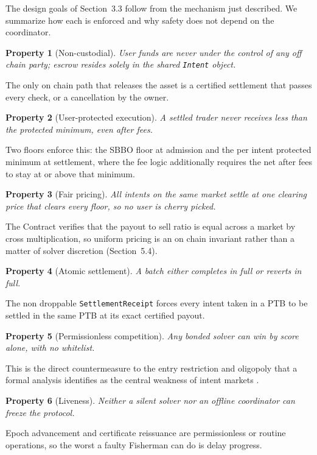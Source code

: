 \documentclass[10pt,sigconf,nonacm]{acmart}
\theoremstyle{reiythm}
\newtheorem{property}{Property}
\begin{document}
The design goals of Section~3.3 follow from the mechanism just described. We
summarize how each is enforced and why safety does not depend on the coordinator.

\begin{property}[Non-custodial]
User funds are never under the control of any off chain party; escrow resides
solely in the shared \texttt{Intent} object.
\end{property}
\noindent The only on chain path that releases the asset is a certified
settlement that passes every check, or a cancellation by the owner.

\begin{property}[User-protected execution]
A settled trader never receives less than the protected minimum, even after fees.
\end{property}
\noindent Two floors enforce this: the SBBO floor at admission and the per intent
protected minimum at settlement, where the fee logic additionally requires the net
after fees to stay at or above that minimum.

\begin{property}[Fair pricing]
All intents on the same market settle at one clearing price that clears every floor,
so no user is cherry picked.
\end{property}
\noindent The Contract verifies that the payout to sell ratio is equal across a
market by cross multiplication, so uniform pricing is an on chain invariant rather
than a matter of solver discretion (Section~5.4).

\begin{property}[Atomic settlement]
A batch either completes in full or reverts in full.
\end{property}
\noindent The non droppable \texttt{SettlementReceipt} forces every intent taken
in a PTB to be settled in the same PTB at its exact certified payout.

\begin{property}[Permissionless competition]
Any bonded solver can win by score alone, with no whitelist.
\end{property}
\noindent This is the direct countermeasure to the entry restriction and oligopoly
that a formal analysis identifies as the central weakness of intent markets
\cite{chitra2024analysisintentbasedmarkets}.

\begin{property}[Liveness]
Neither a silent solver nor an offline coordinator can freeze the protocol.
\end{property}
\noindent Epoch advancement and certificate reissuance are permissionless or
routine operations, so the worst a faulty Fisherman can do is delay progress.
\end{document}
